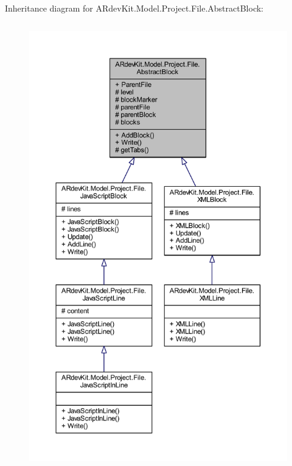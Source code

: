 Inheritance diagram for A\-Rdev\-Kit.\-Model.\-Project.\-File.\-Abstract\-Block\-:
\nopagebreak
\begin{figure}[H]
\begin{center}
\leavevmode
\includegraphics[height=550pt]{class_a_rdev_kit_1_1_model_1_1_project_1_1_file_1_1_abstract_block__inherit__graph}
\end{center}
\end{figure}


